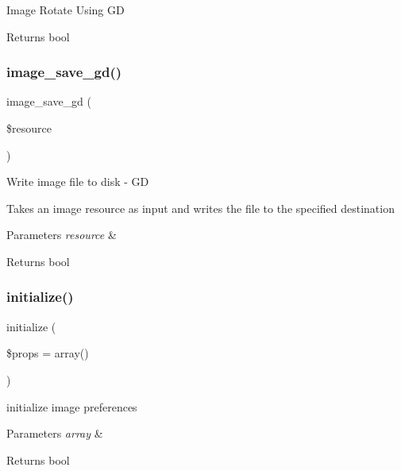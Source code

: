 Image Rotate Using GD

\begin{DoxyReturn}{Returns}
bool 
\end{DoxyReturn}
\mbox{\label{class_c_i___image__lib_a802a33d51249d4d31d59cbc89fbc4dd5}} 
\subsubsection{\texorpdfstring{image\+\_\+save\+\_\+gd()}{image\_save\_gd()}}
{\footnotesize\ttfamily image\+\_\+save\+\_\+gd (\begin{DoxyParamCaption}\item[{}]{\$resource }\end{DoxyParamCaption})}

Write image file to disk -\/ GD

Takes an image resource as input and writes the file to the specified destination


\begin{DoxyParams}{Parameters}
{\em resource} & \\
\hline
\end{DoxyParams}
\begin{DoxyReturn}{Returns}
bool 
\end{DoxyReturn}
\mbox{\label{class_c_i___image__lib_a0bccf32e3d2d283de0521949330cb969}} 
\subsubsection{\texorpdfstring{initialize()}{initialize()}}
{\footnotesize\ttfamily initialize (\begin{DoxyParamCaption}\item[{}]{\$props = {\ttfamily array()} }\end{DoxyParamCaption})}

initialize image preferences


\begin{DoxyParams}{Parameters}
{\em array} & \\
\hline
\end{DoxyParams}
\begin{DoxyReturn}{Returns}
bool 
\end{DoxyReturn}
\mbox{\label{class_c_i___image__lib_a7fa0fd0aabe26803d61d7e09c1cb73de}} 
